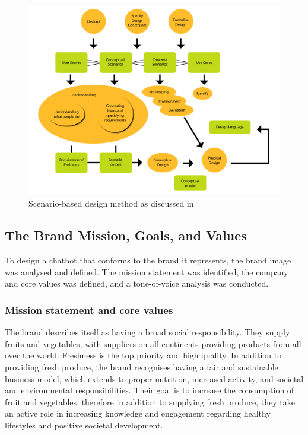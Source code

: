      \begin{figure}
            \centering
            \includegraphics[width=\textwidth]{figures/Scenariobasedmethod.png}
            \caption{Scenario-based design method as discussed in \cite{Benyon2014}}
            \label{fig:scen}
        \end{figure}
    
\vspace{2,5mm} %

    \subsection{The Brand Mission, Goals, and Values}
    To design a chatbot that conforms to the brand it represents, the brand image was analysed and defined. The mission statement was identified, the company and core values was defined, and a tone-of-voice analysis was conducted.
    
\vspace{2,5mm}
    
        \subsubsection{Mission statement and core values}
 
        The brand describes itself as having a broad social responsibility. They supply fruits and vegetables, with suppliers on all continents providing products from all over the world. Freshness is the top priority and high quality. In addition to providing fresh produce, the brand recognises having a fair and sustainable business model, which extends to proper nutrition, increased activity, and societal and environmental responsibilities. Their goal is to increase the consumption of fruit and vegetables, therefore in addition to supplying fresh produce, they take an active role in increasing knowledge and engagement regarding healthy lifestyles and positive societal development.
 
